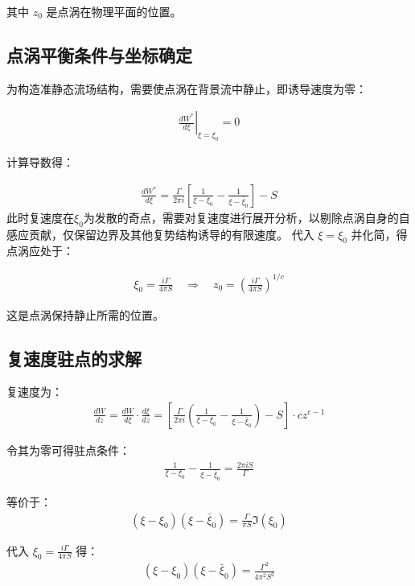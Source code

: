 其中 $z_0$ 是点涡在物理平面的位置。


\subsection{点涡平衡条件与坐标确定}

为构造准静态流场结构，需要使点涡在背景流中静止，即诱导速度为零：

\begin{align}
    \left.\frac{dW^*}{d\xi}\right|_{\xi = \xi_0} = 0
\end{align}

计算导数得：

\begin{align}
    \frac{dW^*}{d\xi} = \frac{\Gamma}{2\pi i} \left[ \frac{1}{\xi - \xi_0} - \frac{1}{\xi - \bar{\xi}_0} \right] - S
\end{align}
此时复速度在$\xi_{0}$为发散的奇点，需要对复速度进行展开分析，以剔除点涡自身的自感应贡献，仅保留边界及其他复势结构诱导的有限速度。
代入 $\xi = \xi_0$ 并化简，得点涡应处于：

\begin{align}
    \xi_0 = \frac{i\Gamma}{4\pi S}
\quad \Rightarrow \quad 
z_0 = \left( \frac{i\Gamma}{4\pi S} \right)^{1/c}
\end{align}

这是点涡保持静止所需的位置。


\subsection{复速度驻点的求解}

复速度为：
\begin{align}
    \frac{dW}{dz} = \frac{dW}{d\xi} \cdot \frac{d\xi}{dz}
= \left[ \frac{\Gamma}{2\pi i} \left( \frac{1}{\xi - \xi_0} - \frac{1}{\xi - \bar{\xi}_0} \right) - S \right] \cdot c z^{c-1}
\end{align}

令其为零可得驻点条件：
\begin{align}
    \frac{1}{\xi - \xi_0} - \frac{1}{\xi - \bar{\xi}_0} = \frac{2\pi i S}{\Gamma}
\end{align}

等价于：
\begin{align}
    (\xi - \xi_0)(\xi - \bar{\xi}_0) = \frac{\Gamma}{\pi S} \Im(\xi_0)
\end{align}

代入 $\xi_0 = \frac{i\Gamma}{4\pi S}$ 得：
\begin{align}
    (\xi - \xi_0)(\xi - \bar{\xi}_0) = \frac{\Gamma^2}{4\pi^2 S^2}
\end{align}

